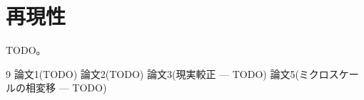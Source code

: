 \documentclass[a4paper,10pt,twocolumn]{ltjsarticle}
\begin{document}
\section{再現性}
TODO。

\begin{thebibliography}{9}
 論文1(TODO)
 論文2(TODO)
 論文3(現実較正 — TODO)
 論文5(ミクロスケールの相変移 — TODO)
\end{thebibliography}
\end{document}
